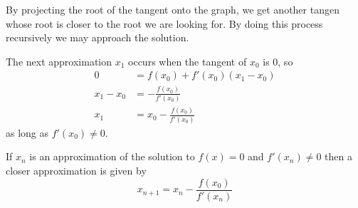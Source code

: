\documentclass[a4paper]{article}
\begin{document}
By projecting the root of the tangent onto the graph, we get another tangen whose root is closer
to the root we are looking for. By doing this process recursively we may approach the solution.

The next approximation \(x_1\) occurs when the tangent of \(x_0\) is 0, so
\begin{align*}
    0 &= f(x_0) + f'(x_0)(x_1 - x_0) \\
    x_1 - x_0 &= - \frac{f(x_0)}{f'(x_0)} \\
    x_1 &= x_0 - \frac{f(x_0)}{f'(x_0)}
\end{align*}
as long as \(f'(x_0) \neq 0\).

If \(x_n\) is an approximation of the solution to \(f(x)=0\) and \(f'(x_n) \neq 0\) then a closer approximation is given by
\[
    x_{n+1} = x_n - \frac{f(x_0)}{f'(x_n)}
\]

\pagebreak
\end{document}
